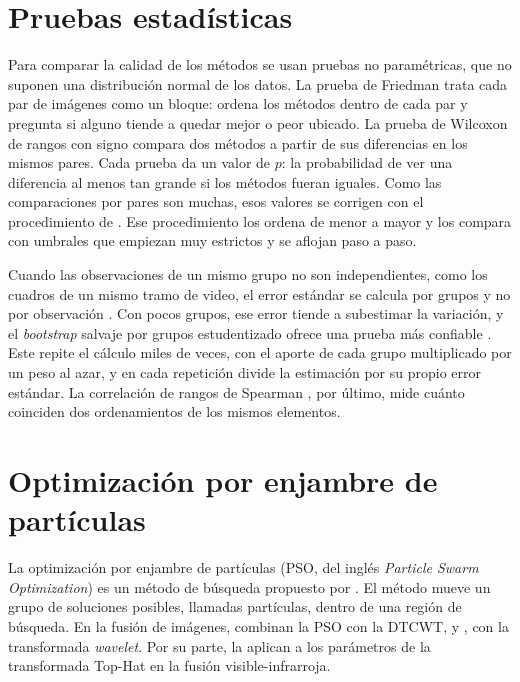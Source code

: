 \section{Pruebas estadísticas}
\label{sec:pruebas}

Para comparar la calidad de los métodos se usan pruebas no paramétricas, que no suponen una distribución
normal de los datos. La prueba de Friedman \parencite{friedman1937} trata cada par de imágenes como un bloque:
ordena los métodos dentro de cada par y pregunta si alguno tiende a quedar mejor o peor ubicado. La prueba de
Wilcoxon de rangos con signo \parencite{wilcoxon1945} compara dos métodos a partir de sus diferencias en
los mismos pares. Cada prueba da un valor de $p$: la probabilidad de ver una diferencia al menos tan
grande si los métodos fueran iguales. Como las comparaciones por pares son muchas, esos valores se
corrigen con el procedimiento de \textcite{holm1979}. Ese procedimiento los ordena de menor a mayor y los
compara con umbrales que empiezan muy estrictos y se aflojan paso a paso.

Cuando las observaciones de un mismo grupo no son independientes, como los cuadros de un mismo tramo de
video, el error estándar se calcula por grupos y no por observación \parencite{cameron2015}. Con pocos
grupos, ese error tiende a subestimar la variación, y el \textit{bootstrap} salvaje por grupos
estudentizado ofrece una prueba más confiable \parencite{cameron2008, webb2023}. Este repite el cálculo
miles de veces, con el aporte de cada grupo multiplicado por un peso al azar, y en cada repetición
divide la estimación por su propio error estándar. La correlación de rangos de Spearman
\parencite{spearman1904}, por último, mide cuánto coinciden dos ordenamientos de los mismos elementos.

\section{Optimización por enjambre de partículas}
\label{sec:pso}

La optimización por enjambre de partículas (PSO, del inglés \textit{Particle Swarm Optimization}) es un
método de búsqueda propuesto por \textcite{kennedy1995}. El método mueve un grupo de soluciones
posibles, llamadas partículas, dentro de una región de búsqueda. En la fusión de imágenes, \textcite{tao2010}
combinan la PSO con la DTCWT, y \textcite{malviya2014}, con la transformada \textit{wavelet}. Por su parte,
\textcite{ortegarodriguez2025} la aplican a los parámetros de la transformada Top-Hat en la fusión
visible-infrarroja.

